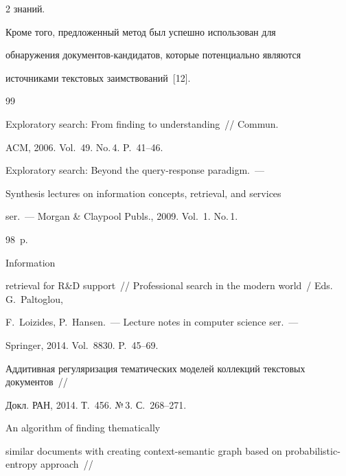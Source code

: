 \begin{multicols}{2}
знаний.

  

  Кроме того, предложенный метод был успешно использован для 

обнаружения до\-ку\-мен\-тов-кан\-ди\-да\-тов, которые потенциально являются 

источниками текстовых заимствований~[12].

  

{\small\frenchspacing

 {%


 \begin{thebibliography}{99}


 Exploratory search: From finding to understanding~// Commun. 

ACM, 2006. Vol.~49. No.\,4. P.~41--46.


 Exploratory search: Beyond the query-response paradigm.~--- 

Synthesis lectures on information concepts, retrieval, and services

ser.~--- Morgan \& Claypool Publs., 2009. Vol.~1. No.\,1.  

98~p.


 Information 

retrieval for R\&D support~// Professional search in the modern world~/ Eds.  G.~Paltoglou, 

F.~Loizides, P.~Hansen.~--- Lecture notes in computer science ser.~---  

Springer, 2014. Vol.~8830. P.~45--69.



Аддитивная регуляризация тематических моделей коллекций текстовых документов~//

Докл. РАН, 2014. Т.~456. №\,3. С.~268--271.






 An algorithm of finding thematically 

similar documents with creating context-semantic graph based on probabilistic-entropy approach~// 


\end{thebibliography}}}
\end{multicols}
